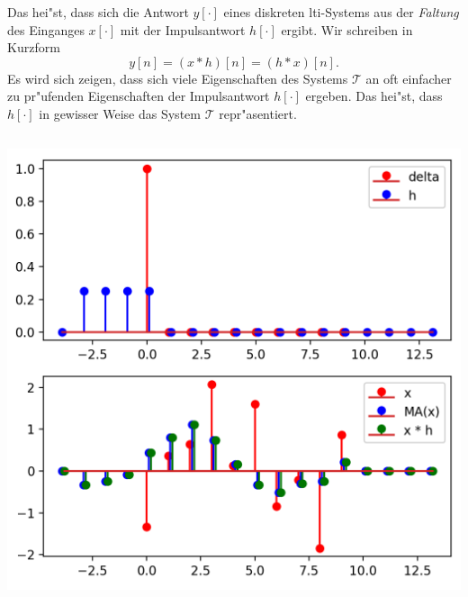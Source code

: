 Das hei"st, dass sich die Antwort $y[\cdot]$ eines diskreten \gls{lti}-Systems aus der \emph{Faltung} des Einganges $x[\cdot]$ mit der Impulsantwort $h[\cdot]$ ergibt.
Wir schreiben in Kurzform
\[
y[n] = (x \ast h)[n] = (h \ast x)[n].
\]
Es wird sich zeigen, dass sich viele Eigenschaften des Systems $\mathcal{T}$ an oft einfacher zu pr"ufenden Eigenschaften der Impulsantwort $h[\cdot]$ ergeben.
Das hei"st, dass $h[\cdot]$ in gewisser Weise das System $\mathcal{T}$ repr"asentiert.
%
\begin{listing}
    \noindent
    \begin{minipage}{0.49\textwidth}
        \strut\vspace*{-\baselineskip}\newline
        \inputminted[firstline=10,lastline=22]{python3}{code/moving_average.py}
    \end{minipage}%
    \begin{minipage}{0.49\textwidth}
        \strut\vspace*{-\baselineskip}\newline
        \includegraphics[width=\textwidth]{code/moving_average.png}
    \end{minipage}
    \label{py:moving_average}
\end{listing}

